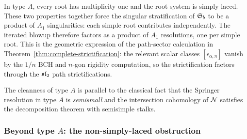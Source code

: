 \begin{remark}
\label{rem:type-A-clean}
In type $A$, every root has multiplicity one and the root system
is simply laced. These two properties together force the singular
stratification of $\mathfrak{S}_b$ to be a product of $A_1$
singularities: each simple root contributes independently. The
iterated blowup therefore factors as a product of $A_1$ resolutions,
one per simple root. This is the geometric expression of the
path-sector calculation in
Theorem~\ref{thm:complete-strictification}: the relevant scalar
classes $[\epsilon_{\alpha,n}]$ vanish by the $1/n$ BCH and
$n$-gon rigidity computation, so the strictification factors through
the $\mathfrak{sl}_2$ path strictifications.

The cleanness of type $A$ is parallel to the classical fact that the
Springer resolution in type $A$ is \emph{semismall} and the
intersection cohomology of $\mathcal{N}$ satisfies the decomposition theorem
with semisimple stalks.
\end{remark}

\subsubsection{Beyond type $A$: the non-simply-laced obstruction}
\label{sssec:beyond-type-A}

